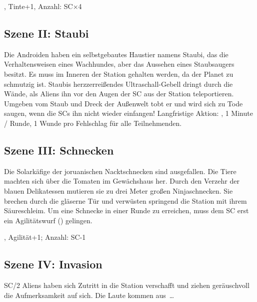 {		, Tinte+1, Anzahl: SC×4

		\subsection{Szene II: Staubi}

		\noindent
		Die Androiden haben ein selbstgebautes Haustier namens Staubi, das die Verhaltensweisen eines Wachhundes, aber das Aussehen eines Staubsaugers besitzt. Es muss im Inneren der Station gehalten werden, da der Planet zu schmutzig ist. Staubis herzzerreißendes Ultraschall-Gebell dringt durch die Wände, als Aliens ihn vor den Augen der SC aus der Station teleportieren. Umgeben vom Staub und Dreck der Außenwelt tobt er und wird sich zu Tode saugen, wenn die SCs ihn nicht wieder einfangen! Langfristige Aktion: , 1 Minute / Runde, 1 Wunde pro Fehlschlag für alle Teilnehmenden.


		\subsection{Szene III: Schnecken}

		\noindent
		Die Solarkäfige der joruanischen Nacktschnecken sind ausgefallen. Die Tiere machten sich über die Tomaten im Gewächshaus her. Durch den Verzehr der blauen Delikatessen mutieren sie zu drei Meter großen Ninjaschnecken. Sie brechen durch die gläserne Tür und verwüsten springend die Station mit ihrem Säureschleim. Um eine Schnecke in einer Runde zu erreichen, muss dem SC erst ein Agilitätswurf () gelingen.

		, Agilität+1; Anzahl: SC-1

		\subsection{Szene IV: Invasion}

		\noindent
		SC/2 Aliens haben sich Zutritt in die Station verschafft und ziehen geräuschvoll die Aufmerksamkeit auf sich. Die Laute kommen aus~\ldots


}
